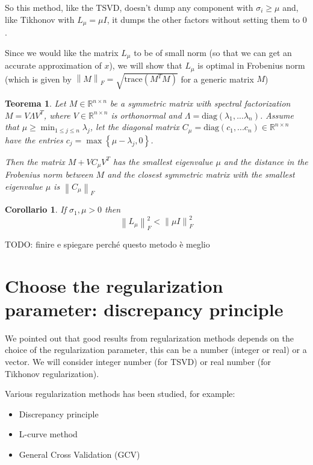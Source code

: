 \documentclass[a4paper,10pt]{article}
\newcounter{counter1}
\theoremstyle{plain}
\newtheorem{myteo}[counter1]{Teorema}
\newtheorem{mycor}[counter1]{Corollario}
\theoremstyle{definition}
\theoremstyle{remark}
\newcommand{\set}[1]{\left\{#1\right\}}
\newcommand{\pa}[1]{\left(#1\right)}
\newcommand{\norm}[1]{\left\|#1\right\|}
\begin{document}
So this method, like the TSVD, doesn't dump any component with $\sigma
_i \ge \mu$ and, like Tikhonov with $L_\mu = \mu I$, it dumps the
other factors without setting them to $0$.

Since we would like the matrix $L_\mu$ to be of small norm (so that we
can get an accurate approximation of $x$), we will show that $L_\mu$
is optimal in Frobenius norm (which is given by $\norm{M}_F = \sqrt{
  \mathrm{trace} \pa{ M^T M } }$ for a generic matrix $M$)

\begin{myteo}
  Let $M \in \mathbb{R}^{n\times n}$ be a symmetric matrix with
  spectral factorization $M = V \Lambda V^T$, where $V \in
  \mathbb{R}^{n \times n}$ is orthonormal and $\Lambda = \mathrm{diag} \pa{
    \lambda _1, ... \lambda _n}$. Assume that $\mu \ge \min _{1\le
    j\le n} \lambda _j$, let the diagonal matrix $C_\mu = \mathrm{diag}
  \pa{ c_1 , ... c_n}\in \mathbb{R}^{n\times n}$ have the entries $c_j
  = \max \set{\mu - \lambda _j, 0}$.
  
  Then the matrix $M + V C_\mu V^T$ has the smallest eigenvalue $\mu$
  and the distance in the Frobenius norm between $M$ and the closest
  symmetric matrix with the smallest eigenvalue $\mu$ is $\norm{ C_\mu
  }_F$
\end{myteo}

\begin{mycor}
  If $\sigma _1,\mu > 0$ then
  \[ \norm{ L_\mu }^2 _F < \norm{ \mu I} ^2_F \]
\end{mycor}

TODO: finire e spiegare perché questo metodo è meglio

\section{Choose the regularization parameter: discrepancy principle}
\label{sec:discrepancy}

We pointed out that good results from regularization methods depends
on the choice of the regularization parameter, this can be a number
(integer or real) or a vector. We will consider integer number (for
TSVD) or real number (for Tikhonov regularization).

Various regularization methods has been studied, for example:
\begin{itemize}
\item Discrepancy principle
\item L-curve method
\item General Cross Validation (GCV)
\end{itemize}
\end{document}
